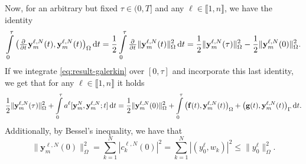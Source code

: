 \documentclass[11pt]{article}
\newcommand{\llb}{\llbracket}
\newcommand{\rrb}{\rrbracket}
\newcommand{\by}{\mathbf{y}}
\begin{document}
	 Now, for an arbitrary but fixed \(\tau \in (0,T]\) and any \(\ell \in \llb 1,n\rrb\), we have the identity 
	 \[
	 	\int\limits_0^\tau \big(\pd{ }{t} \by_m^{\ell,N}(t), \by_m^{\ell,N} (t) \big)_\Omega \dif t
		=
		\frac{1}{2} \int\limits_0^\tau  \pd{ }{t} \| \by_m^{\ell,N}(t) \|_\Omega^2 \dif t
		=
		\frac{1}{2} \| \by_m^{\ell,N}(\tau) \|_\Omega^2 - \frac{1}{2} \| \by_m^{\ell,N}(0) \|_\Omega^2.
	 \]
	 If we integrate \eqref{eq:result-galerkin} over \([0,\tau]\) and incorporate this last identity, we get that for any \(\ell \in \llb 1,n\rrb\) it holds
	 \begin{align}
	 \label{eq:estimate-integrationbyparts}
	 	\frac{1}{2} \| \by_m^{\ell,N}(\tau) \|_\Omega^2
		+ 
		\int\limits_0^\tau a^\ell [\mathbf y_m^{N}, \by_m^{\ell,N}; t] \dif t
		=
		\frac{1}{2} \| \by_m^{\ell,N}(0) \|_\Omega^2 + 
		\int\limits_0^\tau \big( \mathbf{f}(t), \by_m^{\ell,N} (t) \big)_{\Omega} + \big(\mathbf{g}(t),  \by_m^{\ell,N} (t) \big)_\Gamma \dif t.
	 \end{align}
	Additionally, by Bessel's inequality, we have that
	\begin{equation}
	\label{eq:estimate-i}
		\| \by_m^{\ell,N}(0) \|_\Omega^2 = \sum_{k=1}^N |c_k^{\ell,N}(0)|^2 = \sum_{k=1}^N | (y_0^\ell, w_k) |^2 \leq \|y_0^\ell\|_\Omega^2.
	\end{equation}
	
	
	
\end{document}
